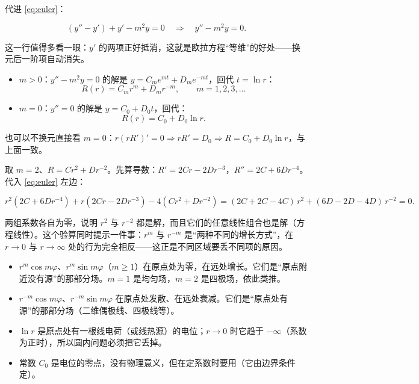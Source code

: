 \documentclass[11pt]{ctexart}
\let\origsubhdr\subhdr
\renewcommand{\subhdr}[1]{\par\needspace{3\baselineskip}\origsubhdr{#1}}
\let\orighdr\hdr
\renewcommand{\hdr}[2]{\par\needspace{6\baselineskip}\orighdr{#1}{#2}}
\begin{document}
代进 \eqref{eq:euler}：

\[
(y''-y')+y'-m^2y=0\quad\Longrightarrow\quad y''-m^2y=0 .
\]

这一行值得多看一眼：$y'$ 的两项正好抵消，这就是欧拉方程“等维”的好处——换元后一阶项自动消失。


\begin{itemize}
  \item $m>0$：$y''-m^2y=0$ 的解是 $y=C_me^{mt}+D_me^{-mt}$，回代 $t=\ln r$：
  \[
  R(r)=C_mr^m+D_mr^{-m},\qquad m=1,2,3,\dots
  \]
  \item $m=0$：$y''=0$ 的解是 $y=C_0+D_0t$，回代：
  \[
  R(r)=C_0+D_0\ln r .
  \]
\end{itemize}

也可以不换元直接看 $m=0$：$r(rR')'=0\Rightarrow rR'=D_0\Rightarrow R=C_0+D_0\ln r$，与上面一致。


取 $m=2$、$R=Cr^2+Dr^{-2}$。先算导数：$R'=2Cr-2Dr^{-3}$，$R''=2C+6Dr^{-4}$。代入 \eqref{eq:euler} 左边：

\[
r^2(2C+6Dr^{-4})+r(2Cr-2Dr^{-3})-4(Cr^2+Dr^{-2})
=(2C+2C-4C)\,r^2+(6D-2D-4D)\,r^{-2}=0 .
\]

两组系数各自为零，说明 $r^2$ 与 $r^{-2}$ 都是解，而且它们的任意线性组合也是解（方程线性）。这个验算同时提示一件事：$r^m$ 与 $r^{-m}$ 是“两种不同的增长方式”，在 $r\to0$ 与 $r\to\infty$ 处的行为完全相反——这正是不同区域要丢不同项的原因。


\begin{itemize}
  \item $r^m\cos m\varphi$、$r^m\sin m\varphi$（$m\ge1$）在原点处为零，在远处增长。它们是“原点附近没有源”的那部分场。$m=1$ 是均匀场，$m=2$ 是四极场，依此类推。
  \item $r^{-m}\cos m\varphi$、$r^{-m}\sin m\varphi$ 在原点处发散、在远处衰减。它们是“原点处有源”的那部分场（二维偶极线、四极线等）。
  \item $\ln r$ 是原点处有一根线电荷（或线热源）的电位；$r\to0$ 时它趋于 $-\infty$（系数为正时），所以圆内问题必须把它丢掉。
  \item 常数 $C_0$ 是电位的零点，没有物理意义，但在定系数时要用（它由边界条件定）。
\end{itemize}

\label{sec:s5}
\end{document}
